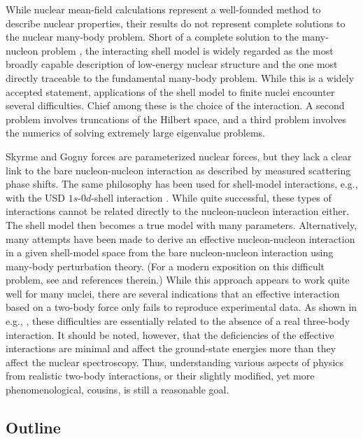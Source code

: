 \documentclass[rmp,aps,floatfix]{revtex4}
\begin{document}
While nuclear mean-field calculations represent a well-founded 
method to describe nuclear properties, their results do not
represent complete solutions to the nuclear many-body problem. 
Short of a complete solution to the many-nucleon problem \cite{Vijay}, the
interacting shell model is widely regarded as the most broadly capable
description of low-energy nuclear structure and the one most 
directly traceable to the fundamental many-body problem. While
this is a widely accepted statement, applications of the shell model 
to finite nuclei encounter several difficulties. Chief among these
is the choice of the interaction. A second problem involves 
truncations of the Hilbert space, and a third problem involves 
the numerics of solving extremely large eigenvalue problems. 

Skyrme and Gogny forces are parameterized nuclear forces, but they
lack a clear link to the bare nucleon-nucleon interaction as
described by measured scattering phase shifts.  The same philosophy 
has been used for shell-model interactions, e.g., with the
USD $1s$-$0d$-shell interaction \cite{wilden}. While quite
successful, these types of interactions cannot be related 
directly to the nucleon-nucleon interaction either. The shell model
then becomes a true model with many parameters. Alternatively, 
many attempts have been made to derive an effective nucleon-nucleon
interaction in a given shell-model space from the bare nucleon-nucleon
interaction using many-body perturbation theory. (For a modern exposition
on this difficult problem, see \cite{mhj_95} and references therein.)
While this approach appears to work quite well for many nuclei, there 
are several indications \cite{Vijay,vijay2,vijay3} that an effective 
interaction based on a two-body force only fails to reproduce experimental
data. As shown in e.g., \cite{Vijay,vijay2,vijay3}, these
difficulties are essentially related to the absence of a real
three-body interaction. It should
be noted, however, that the deficiencies of the effective
interactions are minimal and affect the ground-state energies more
than they affect the nuclear spectroscopy. Thus, understanding 
various aspects of physics from realistic two-body interactions, or their 
slightly modified, yet more phenomenological, cousins,
is still a reasonable goal. 


\subsection{Outline}
\end{document}
